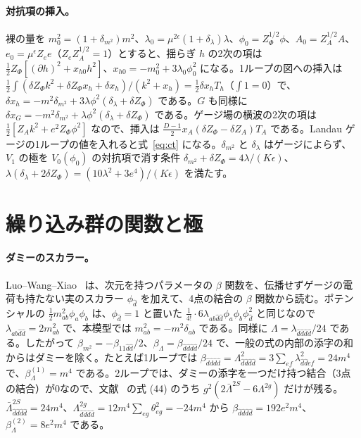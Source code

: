 \documentclass[a4paper,10pt]{ltjsarticle}
\begin{document}
\paragraph{対抗項の挿入。}裸の量を $m_0^2=(1+\delta_{m^2})m^2$、$\lambda_0=\mu^{2\epsilon}(1+\delta_\lambda)\lambda$、$\phi_0=Z_\Phi^{1/2}\phi$、$A_0=Z_A^{1/2}A$、$e_0=\mu^\epsilon Z_ee$（$Z_eZ_A^{1/2}=1$）とすると、揺らぎ $h$ の2次の項は $\frac12Z_\Phi[(\partial h)^2+x_{h0}h^2]$、$x_{h0}=-m_0^2+3\lambda_0\phi_0^2$ になる。1ループの図への挿入は $\frac12\int(\delta Z_\Phi k^2+\delta Z_\Phi x_h+\delta x_h)/(k^2+x_h)=\frac12\delta x_hT_h$（$\int1=0$）で、$\delta x_h=-m^2\delta_{m^2}+3\lambda\phi^2(\delta_\lambda+\delta Z_\Phi)$ である。$G$ も同様に $\delta x_G=-m^2\delta_{m^2}+\lambda\phi^2(\delta_\lambda+\delta Z_\Phi)$ である。ゲージ場の横波の2次の項は $\frac12[Z_Ak^2+e^2Z_\Phi\phi^2]$ なので、挿入は $\frac{D-1}2x_A(\delta Z_\Phi-\delta Z_A)T_A$ である。Landau ゲージの1ループの値を入れると式~\eqref{eq:ct} になる。$\delta_{m^2}$ と $\delta_\lambda$ はゲージによらず、$V_1$ の極を $V_0(\phi_0)$ の対抗項で消す条件 $\delta_{m^2}+\delta Z_\Phi=4\lambda/(K\epsilon)$、$\lambda(\delta_\lambda+2\delta Z_\Phi)=(10\lambda^2+3e^4)/(K\epsilon)$ を満たす。

\section{繰り込み群の関数と極}\label{app:rg}

\paragraph{ダミーのスカラー。}Luo--Wang--Xiao~\cite{lwx03} は、次元を持つパラメータの $\beta$ 関数を、伝播せずゲージの電荷も持たない実のスカラー $\phi_{\hat d}$ を加えて、4点の結合の $\beta$ 関数から読む。ポテンシャルの $\frac12m^2_{ab}\phi_a\phi_b$ は、$\phi_{\hat d}=1$ と置いた $\frac1{4!}\cdot6\lambda_{ab\hat d\hat d}\phi_a\phi_b\phi_{\hat d}^2$ と同じなので $\lambda_{ab\hat d\hat d}=2m^2_{ab}$ で、本模型では $m^2_{ab}=-m^2\delta_{ab}$ である。同様に $\Lambda=\lambda_{\hat d\hat d\hat d\hat d}/24$ である。したがって $\beta_{m^2}=-\beta_{11\hat d\hat d}/2$、$\beta_\Lambda=\beta_{\hat d\hat d\hat d\hat d}/24$ で、一般の式の内部の添字の和からはダミーを除く。たとえば1ループでは $\beta_{\hat d\hat d\hat d\hat d}=\Lambda^2_{\hat d\hat d\hat d\hat d}=3\sum_{ef}\lambda_{\hat d\hat def}^2=24m^4$ で、$\beta_\Lambda^{(1)}=m^4$ である。2ループでは、ダミーの添字を一つだけ持つ結合（3点の結合）が0なので、文献~\cite{lwx03} の式 (44) のうち $g^2(2\bar\Lambda^{2S}-6\Lambda^{2g})$ だけが残る。$\bar\Lambda^{2S}_{\hat d\hat d\hat d\hat d}=24m^4$、$\Lambda^{2g}_{\hat d\hat d\hat d\hat d}=12m^4\sum_{eg}\theta_{eg}^2=-24m^4$ から $\beta_{\hat d\hat d\hat d\hat d}=192e^2m^4$、$\beta_\Lambda^{(2)}=8e^2m^4$ である。
\end{document}
